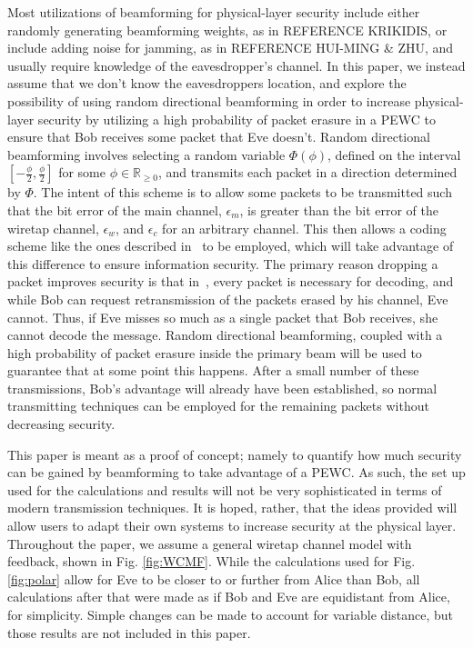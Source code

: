 \documentclass[letterpaper, 10 pt, conference]{ieeetran}  %
\theoremstyle{definition}
\theoremstyle{theorem}
\begin{document}
Most utilizations of beamforming for physical-layer security include either randomly generating beamforming weights, as in REFERENCE KRIKIDIS, or include adding noise for jamming, as in REFERENCE HUI-MING \& ZHU, and usually require knowledge of the eavesdropper's channel.  
In this paper, we instead assume that we don't know the eavesdroppers location, and explore the possibility of using random directional beamforming in order to increase physical-layer security by utilizing a high probability of packet erasure in a \ac{PEWC} to ensure that Bob receives some packet that Eve doesn't.  
Random directional beamforming involves selecting a random variable $\Phi\left(\phi\right)$, defined on the interval $\left[ -\frac{\phi}{2},\frac{\phi}{2}\right]$ for some $\phi \in \mathbb{R}_{\geq 0}$, and transmits each packet in a direction determined by $\Phi$.  
The intent of this scheme is to allow some packets to be transmitted such that the bit error of the main channel, $\epsilon_{m}$, is greater than the bit error of the wiretap channel, $\epsilon_{w}$, and $\epsilon_{c}$ for an arbitrary channel.  
This then allows a coding scheme like the ones described in~\cite{Harrison2010, Harrison2011} to be employed, which will take advantage of this difference to ensure information security.  
The primary reason dropping a packet improves security is that in~\cite{Harrison2010, Harrison2011}, every packet is necessary for decoding, and while Bob can request retransmission of the packets erased by his channel, Eve cannot.  
Thus, if Eve misses so much as a single packet that Bob receives, she cannot decode the message.  
Random directional beamforming, coupled with a high probability of packet erasure inside the primary beam will be used to guarantee that at some point this happens.  
After a small number of these transmissions, Bob's advantage will already have been established, so normal transmitting techniques can be employed for the remaining packets without decreasing security.  

This paper is meant as a proof of concept; namely to quantify how much security can be gained by beamforming to take advantage of a \ac{PEWC}.  
As such, the set up used for the calculations and results will not be very sophisticated in terms of modern transmission techniques.  
It is hoped, rather, that the ideas provided will allow users to adapt their own systems to increase security at the physical layer.  
Throughout the paper, we assume a general wiretap channel model with feedback, shown in Fig. \ref{fig:WCMF}.  
While the calculations used for Fig. \ref{fig:polar} allow for Eve to be closer to or further from Alice than Bob, all calculations after that were made as if Bob and Eve are equidistant from Alice, for simplicity.  
Simple changes can be made to account for variable distance, but those results are not included in this paper.  
\end{document}
